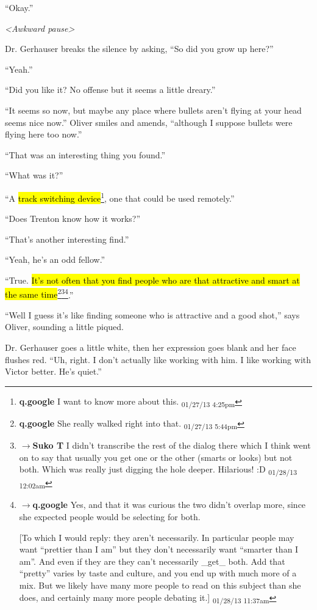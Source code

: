 ``Okay.''

\textit{\textless Awkward pause\textgreater }

Dr. Gerhauser breaks the silence by asking, ``So did you grow up here?''

``Yeah.''

``Did you like it?  No offense but it seems a little dreary.''

``It seems so now, but maybe any place where bullets aren't flying at your head seems nice now.''  Oliver smiles and amends, ``although I suppose bullets were flying here too now.''

``That was an interesting thing you found.''

``What was it?''

``A \hl{track switching device}\footnote{\textbf{q.google }I want to know more about this. \textsubscript{01/27/13 4:25pm}}, one that could be used remotely.''

``Does Trenton know how it works?''

``That's another interesting find.''

``Yeah, he's an odd fellow.''

``True.  \hl{It's not often that you find people who are that attractive and smart at the same time}\footnote{\textbf{q.google }She really walked right into that. \textsubscript{01/27/13 5:44pm}}\footnote{$\rightarrow$\textbf{Suko T }I didn't transcribe the rest of the dialog there which I think went on to say that usually you get one or the other (smarts or looks) but not both.  Which was really just digging the hole deeper.  Hilarious! :D \textsubscript{01/28/13 12:02am}}\footnote{$\rightarrow$\textbf{q.google }Yes, and that it was curious the two didn't overlap more, since she expected people would be selecting for both.

{[}To which I would reply: they aren't necessarily.  In particular people may want ``prettier than I am'' but they don't necessarily want ``smarter than I am''.  And even if they are they can't necessarily \_get\_ both.  Add that ``pretty'' varies by taste and culture, and you end up with much more of a mix.  But we likely have many more people to read on this subject than she does, and certainly many more people debating it.{]} \textsubscript{01/28/13 11:37am}}.''

``Well I guess it's like finding someone who is attractive and a good shot,'' says Oliver, sounding a little piqued.

Dr. Gerhauser goes a little white, then her expression goes blank and her face flushes red.  ``Uh, right.  I don't actually like working with him.  I like working with Victor better.  He's quiet.''

